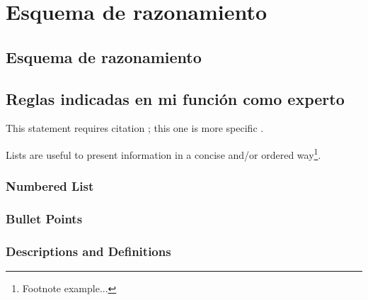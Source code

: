 
\chapter{Esquema de razonamiento}

\section{Esquema de razonamiento}

\section{Reglas indicadas en mi función como experto}

This statement requires citation \cite{book_key}; this one is more specific \cite[122]{article_key}.

Lists are useful to present information in a concise and/or ordered way\footnote{Footnote example...}.

\subsection{Numbered List}
\subsection{Bullet Points}
\subsection{Descriptions and Definitions}
